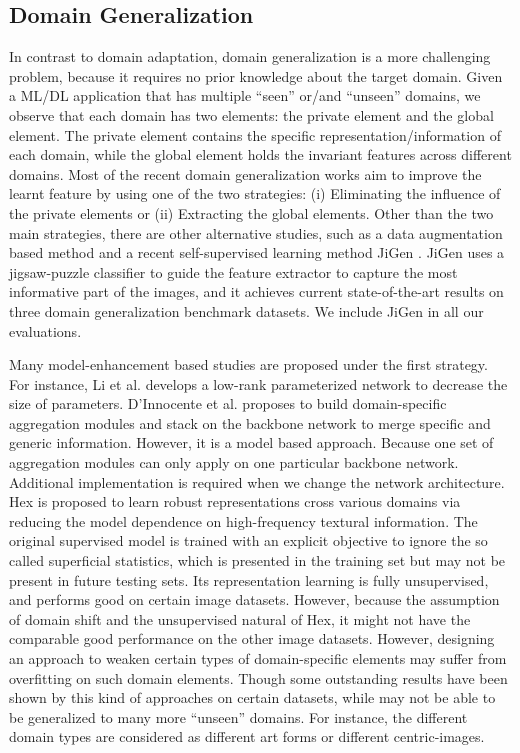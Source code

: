 \documentclass[twocolumn,preprint]{elsarticle}
\begin{document}
\subsection{Domain Generalization} \label{sub:DG}
In contrast to domain adaptation, domain generalization is a more challenging problem, because it requires no prior knowledge about the target domain.
Given a ML/DL application that has multiple ``seen'' or/and ``unseen'' domains, we observe that each domain has two elements: the private element and the global element. The private element contains the specific representation/information of each domain, while the global element holds the invariant features across different domains. 
Most of the recent domain generalization works aim to improve the learnt feature by using one of the two strategies: (i) Eliminating the influence of the private elements or (ii) Extracting the global elements. 
Other than the two main strategies, there are other alternative studies, such as a data augmentation based method \cite{domain-randomization} and a recent self-supervised learning method JiGen \cite{jigsaw}. JiGen \cite{jigsaw} uses a jigsaw-puzzle classifier to guide the feature extractor to capture the most informative part of the images, and it achieves current state-of-the-art results on three domain generalization benchmark datasets. We include JiGen \cite{jigsaw} in all our evaluations.

Many model-enhancement based studies are proposed under the first strategy. 
For instance, 
Li et al. \cite{tf} develops a low-rank parameterized network to decrease the size of parameters.
D’Innocente et al. \cite{dsam} proposes to build domain-specific aggregation modules and stack on the backbone network to merge specific and generic information. However, it is a model based approach. Because one set of aggregation modules can only apply on one particular backbone network. Additional implementation is required when we change the network architecture.
Hex \cite{hex} is proposed to learn robust representations cross various domains via reducing the model dependence on high-frequency textural information. The original supervised model is trained with an explicit objective to ignore the so called superficial statistics, which is presented in the training set but may not be present in future testing sets. Its representation learning is fully unsupervised, and performs good on certain image datasets. However, because the assumption of domain shift and the unsupervised natural of Hex, it might not have the comparable good performance on the other image datasets. 
However, designing an approach to weaken certain types of domain-specific elements may suffer from overfitting on such domain elements. 
Though some outstanding results have been shown by this kind of approaches on certain datasets, while may not be able to be generalized to many more ``unseen'' domains. For instance, the different domain types are considered as different art forms or different centric-images.
\end{document}
